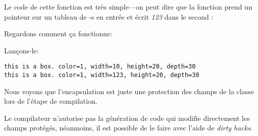 Le code de cette fonction est très simple---on peut dire que la fonction prend un
pointeur sur un tableau de \Tint{}-s en entrée et écrit \emph{123} dans le second \Tint{}:



Regardons comment ça fonctionne:



Lançons-le:

\begin{lstlisting}
this is a box. color=1, width=10, height=20, depth=30
this is a box. color=1, width=123, height=20, depth=30
\end{lstlisting}

Nous voyons que l'encapsulation est juste une protection des champs de la classe
lors de l'étape de compilation.

Le compilateur \Cpp n'autorise pas la génération de code qui modifie directement
les champs protégés, néanmoins, il est possible de le faire avec l'aide de \emph{dirty hacks}.
